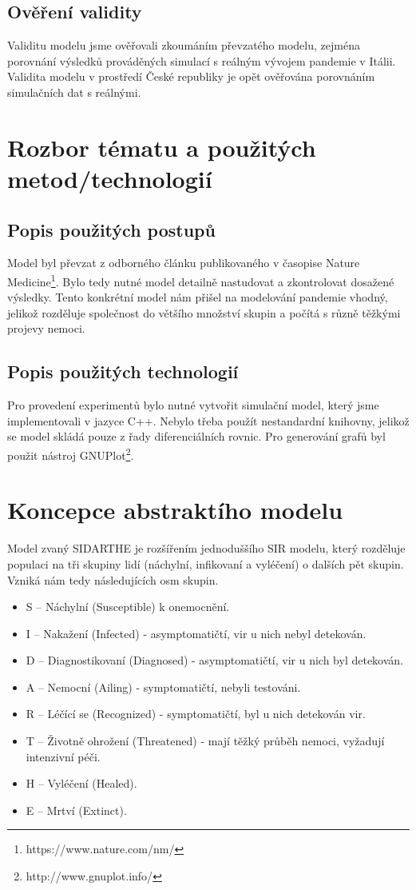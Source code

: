 \documentclass[a4paper,11pt]{article}
\begin{document}
	\subsection{Ověření validity}
		Validitu modelu jsme ověřovali zkoumáním převzatého modelu, zejména porovnání výsledků prováděných simulací s reálným vývojem pandemie v Itálii. Validita modelu v prostředí České republiky je opět ověřována porovnáním simulačních dat s reálnými.
	
	\section{Rozbor tématu a použitých metod/technologií}
		
	
	\subsection{Popis použitých postupů}
		Model byl převzat z odborného článku \cite{source} publikovaného v časopise Nature Medicine\footnote{https://www.nature.com/nm/}. Bylo tedy nutné model detailně nastudovat a zkontrolovat dosažené výsledky. Tento konkrétní model nám přišel na modelování pandemie vhodný, jelikož rozděluje společnost do většího množství skupin a počítá s různě těžkými projevy nemoci.
	
	\subsection{Popis použitých technologií}
		Pro provedení experimentů bylo nutné vytvořit simulační model, který jsme implementovali v jazyce C++. Nebylo třeba použít nestandardní knihovny, jelikož se model skládá pouze z řady diferenciálních rovnic. Pro generování grafů byl použit nástroj GNUPlot\footnote{http://www.gnuplot.info/}.
	
	\pagebreak		
	\section{Koncepce abstraktího modelu}
		Model zvaný SIDARTHE je rozšířením jednoduššího SIR modelu, který rozděluje populaci na tři skupiny lidí (náchylní, infikovaní a vyléčení) o dalších pět skupin. Vzniká nám tedy následujících osm skupin.
		
		\begin{itemize}
			\item S -- Náchylní (Susceptible) k onemocnění.
			\item I -- Nakažení (Infected) - asymptomatičtí, vir u nich nebyl detekován.
			\item D -- Diagnostikovaní (Diagnosed) - asymptomatičtí, vir u nich byl detekován.
			\item A -- Nemocní (Ailing) - symptomatičtí, nebyli testováni.
			\item R -- Léčící se (Recognized) - symptomatičtí, byl u nich detekován vir.
			\item T -- Životně ohrožení (Threatened) - mají těžký průběh nemoci, vyžadují intenzivní péči.
			\item H -- Vyléčení (Healed).
			\item E -- Mrtví (Extinct).
		\end{itemize}
	
\end{document}
